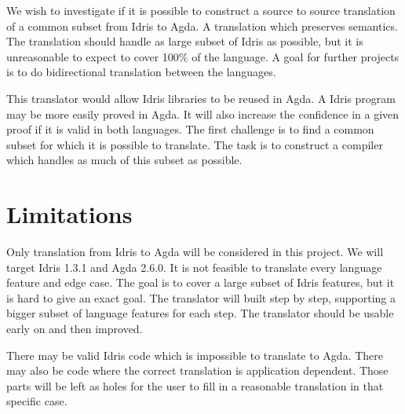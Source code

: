 \documentclass[parskip=half]{scrartcl}
\begin{document}


We wish to investigate if it is possible to construct a source to source
translation of a common subset from Idris to Agda. A translation which
preserves semantics. The translation should handle as large subset of Idris as
possible, but it is unreasonable to expect to cover 100\% of the language.
A goal for further projects is to do bidirectional translation between the
languages.

This translator would allow Idris libraries to be reused in Agda. A Idris
program may be more easily proved in Agda.  It will also increase the
confidence in a given proof if it is valid in both languages.  The first
challenge is to find a common subset for which it is possible to translate. The
task is to construct a compiler which handles as much of this subset as
possible.


\section{Limitations}
Only translation from Idris to Agda will be considered in this project. We will
target Idris 1.3.1 and Agda 2.6.0. It is not feasible to translate every
language feature and edge case.  The goal is to cover a large subset of Idris
features, but it is hard to give an exact goal.  The translator will built step
by step, supporting a bigger subset of language features for each step. The
translator should be usable early on and then improved.

There may be valid Idris code which is impossible to translate to Agda. There
may also be code where the correct translation is application dependent. Those
parts will be left as holes for the user to fill in a reasonable translation in
that specific case.


\end{document}
